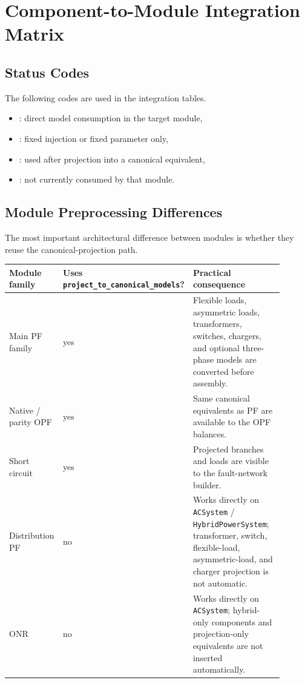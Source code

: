 \section{Component-to-Module Integration Matrix}

\subsection{Status Codes}

The following codes are used in the integration tables.
\begin{itemize}
  \item {}: direct model consumption in the target module,
  \item {}: fixed injection or fixed parameter only,
  \item {}: used after projection into a canonical equivalent,
  \item {}: not currently consumed by that module.
\end{itemize}

\subsection{Module Preprocessing Differences}

The most important architectural difference between modules is whether they
reuse the canonical-projection path.
\begin{longtable}{L{0.20\linewidth}L{0.27\linewidth}L{0.43\linewidth}}
\toprule
Module family & Uses \texttt{project\_to\_canonical\_models}? & Practical consequence \\
\midrule
\endhead
Main PF family & yes & Flexible loads, asymmetric loads, transformers, switches, chargers, and optional three-phase models are converted before assembly. \\
Native / parity OPF & yes & Same canonical equivalents as PF are available to the OPF balances. \\
Short circuit & yes & Projected branches and loads are visible to the fault-network builder. \\
Distribution PF & no & Works directly on \texttt{ACSystem} / \texttt{HybridPowerSystem}; transformer, switch, flexible-load, asymmetric-load, and charger projection is not automatic. \\
ONR & no & Works directly on \texttt{ACSystem}; hybrid-only components and projection-only equivalents are not inserted automatically. \\
\bottomrule
\end{longtable}

